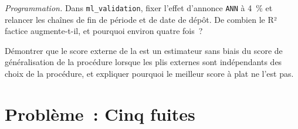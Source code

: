 \begin{exercise}[$\star\star\star$]\label{exo:ml:validation:7}
\emph{Programmation.} Dans \texttt{ml\_validation}, fixer l'effet d'annonce \texttt{ANN} à 4~\% et relancer les chaînes de fin de période et
de date de dépôt. De combien le R² factice augmente-t-il, et pourquoi environ quatre fois~?
\end{exercise}

\begin{exercise}[$\star\star\star$]\label{exo:ml:validation:8}
Démontrer que le score externe de la  est un estimateur sans biais du score de généralisation de la procédure lorsque
les plis externes sont indépendants des choix de la procédure, et expliquer pourquoi le meilleur score à plat ne l'est pas.
\end{exercise}

\section{Problème~: Cinq fuites}

